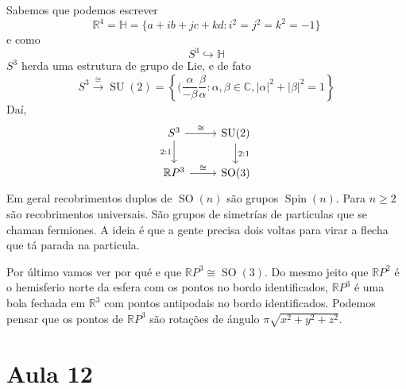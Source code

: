 Sabemos que podemos escrever 
\[\mathbb{R}^{4}=\mathbb{H}=\{a+ib+jc+kd:i^2=j^2=k^2=-1\} \]
e como
\[S^3\hookrightarrow \mathbb{H}\]
$S^3$ herda uma estrutura de grupo de Lie, e de fato
\[S^3\overset{\cong }{\longrightarrow}\operatorname{SU}(2) = \left\{ (\frac{\alpha}{-\beta}\frac{\beta}{\alpha}:\alpha,\beta\in\mathbb{C},|\alpha|^2+|\beta|^2=1\right\} \]
Da\'i,
\[\begin{tikzcd}
	S^3\arrow[r,"\cong "]\arrow[d,"2:1",swap]&\operatorname{SU}(2)\arrow[d,"2:1"]\\
	\mathbb{R}P^{3}\arrow[r,"\cong "]&\operatorname{SO}(3)
\end{tikzcd}\]
Em geral recobrimentos duplos de $\operatorname{SO}(n)$ s\~ao grupos $\operatorname{Spin}(n)$. Para $n\geq 2$ s\~ao recobrimentos universais. S\~ao grupos de simetr\'ias de particulas que se chaman fermiones. A ideia \'e que a gente precisa dois voltas para virar a flecha que t\'a parada na particula.

Por \'ultimo vamos ver por qu\'e e que $\mathbb{R}P^{3}\cong \operatorname{SO}(3)$. Do mesmo jeito que $\mathbb{R}P^{2}$ \'e o hemisferio norte da esfera com os pontos no bordo identificados, $\mathbb{R}P^{3}$ \'e uma bola fechada em $\mathbb{R}^3$ com pontos antipodais no bordo identificados. Podemos pensar que os pontos de $\mathbb{R}P^{3}$ s\~ao rota\c c\~oes  de \'angulo $\pi\sqrt{x^2+y^2+z^2}$.


\section{Aula 12}





